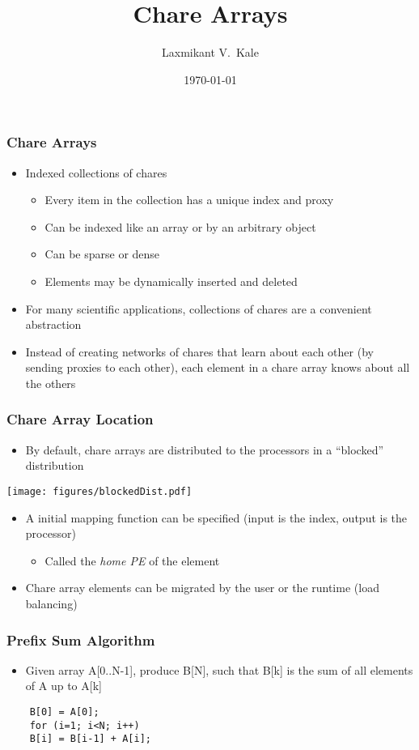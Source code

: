 \documentclass{beamer}
\title{Chare Arrays}
\author[Laxmikant V.~Kale]{
Laxmikant V.~Kale
}
\date{\today}
\begin{document}
\begin{frame}[fragile]
  \frametitle{Chare Arrays}
  \begin{itemize}
    \item Indexed collections of chares
      \begin{itemize}
      \item Every item in the collection has a unique index and proxy
      \item Can be indexed like an array or by an arbitrary object
      \item Can be sparse or dense
      \item Elements may be dynamically inserted and deleted
      \end{itemize}
    \item For many scientific applications, collections of chares are a
      convenient abstraction
    \item Instead of creating networks of chares that learn about each other
      (by sending proxies to each other), each element in a chare array knows
      about all the others
  \end{itemize}
\end{frame}

\begin{frame}
  \frametitle{Chare Array Location}
  \begin{itemize}
  \item By default, chare arrays are distributed to the processors in a
    ``blocked'' distribution
  \end{itemize}
  \begin{center} \texttt{[image: figures/blockedDist.pdf]} \end{center}
  \begin{itemize}
  \item A initial mapping function can be specified (input is the index, output
    is the processor)
    \begin{itemize}
    \item Called the \emph{home PE} of the element
    \end{itemize}
  \item Chare array elements can be migrated by the user or the runtime (load balancing)
  \end{itemize}
\end{frame}





\begin{frame}[fragile]
  \frametitle{Prefix Sum Algorithm}
  \begin{itemize}
  \item Given array A[0..N-1], produce B[N], such that B[k] is the sum of all
  elements of A up to A[k]
  \end{itemize}
    \begin{lstlisting}
    B[0] = A[0];
    for (i=1; i<N; i++) 
    B[i] = B[i-1] + A[i];
    \end{lstlisting}
\end{frame}
\end{document}
